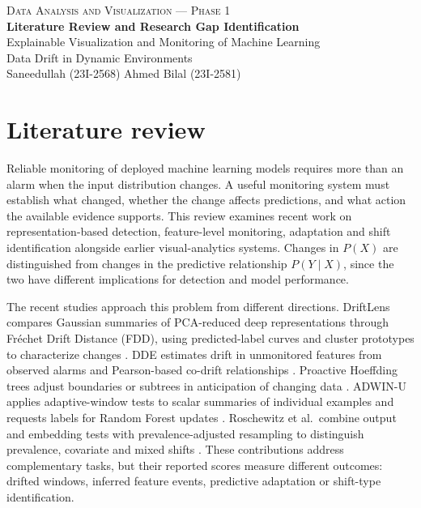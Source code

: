 \documentclass[10pt,a4paper]{article}
\begin{document}
\pagestyle{plain}
\begin{center}
{\small\textsc{Data Analysis and Visualization --- Phase 1}}\\[3pt]
{\Large\bfseries Literature Review and Research Gap Identification}\\[4pt]
{\normalsize Explainable Visualization and Monitoring of Machine Learning\\
Data Drift in Dynamic Environments}\\[4pt]
{\small Saneedullah (23I-2568) \quad Ahmed Bilal (23I-2581)}
\end{center}

\begingroup
\fontsize{11}{13}\selectfont
\section*{Literature review}
Reliable monitoring of deployed machine learning models requires more than an alarm when the input distribution changes. A useful monitoring system must establish what changed, whether the change affects predictions, and what action the available evidence supports. This review examines recent work on representation-based detection, feature-level monitoring, adaptation and shift identification alongside earlier visual-analytics systems. Changes in $P(X)$ are distinguished from changes in the predictive relationship $P(Y\mid X)$, since the two have different implications for detection and model performance.

The recent studies approach this problem from different directions. DriftLens compares Gaussian summaries of PCA-reduced deep representations through Fr\'echet Drift Distance (FDD), using predicted-label curves and cluster prototypes to characterize changes \cite[Secs.~IV--V]{greco}. DDE estimates drift in unmonitored features from observed alarms and Pearson-based co-drift relationships \cite[Secs.~2,4--5]{szucs}. Proactive Hoeffding trees adjust boundaries or subtrees in anticipation of changing data \cite[Secs.~4--6]{guerrero}. ADWIN-U applies adaptive-window tests to scalar summaries of individual examples and requests labels for Random Forest updates \cite[Secs.~4--6]{assis}. Roschewitz et al.\ combine output and embedding tests with prevalence-adjusted resampling to distinguish prevalence, covariate and mixed shifts \cite[Sec.~3]{roschewitz}. These contributions address complementary tasks, but their reported scores measure different outcomes: drifted windows, inferred feature events, predictive adaptation or shift-type identification.
\end{document}
